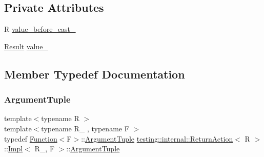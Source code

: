 \subsection*{Private Attributes}
\begin{DoxyCompactItemize}
\item 
R \mbox{\hyperlink{classtesting_1_1internal_1_1_return_action_1_1_impl_a0dbd2f08128302c1395063f84f661366}{value\+\_\+before\+\_\+cast\+\_\+}}
\item 
\mbox{\hyperlink{classtesting_1_1_action_interface_a7477de2fe3e4e01c59db698203acaee7}{Result}} \mbox{\hyperlink{classtesting_1_1internal_1_1_return_action_1_1_impl_a75916c30e7f8bb0388f3313788f25fa5}{value\+\_\+}}
\end{DoxyCompactItemize}


\subsection{Member Typedef Documentation}
\mbox{\label{classtesting_1_1internal_1_1_return_action_1_1_impl_ae6311cbcb9aefd71304a7e40b24be62b}} 
\subsubsection{\texorpdfstring{ArgumentTuple}{ArgumentTuple}\hspace{0.1cm}{\footnotesize\ttfamily [1/3]}}
{\footnotesize\ttfamily template$<$typename R $>$ \\
template$<$typename R\+\_\+ , typename F $>$ \\
typedef \mbox{\hyperlink{structtesting_1_1internal_1_1_function}{Function}}$<$F$>$\+::\mbox{\hyperlink{classtesting_1_1_action_interface_af72720d864da4d606629e83edc003511}{Argument\+Tuple}} \mbox{\hyperlink{classtesting_1_1internal_1_1_return_action}{testing\+::internal\+::\+Return\+Action}}$<$ R $>$\+::\mbox{\hyperlink{classtesting_1_1internal_1_1_return_action_1_1_impl}{Impl}}$<$ R\+\_\+, F $>$\+::\mbox{\hyperlink{classtesting_1_1_action_interface_af72720d864da4d606629e83edc003511}{Argument\+Tuple}}}

\mbox{\label{classtesting_1_1internal_1_1_return_action_1_1_impl_ae6311cbcb9aefd71304a7e40b24be62b}} 
